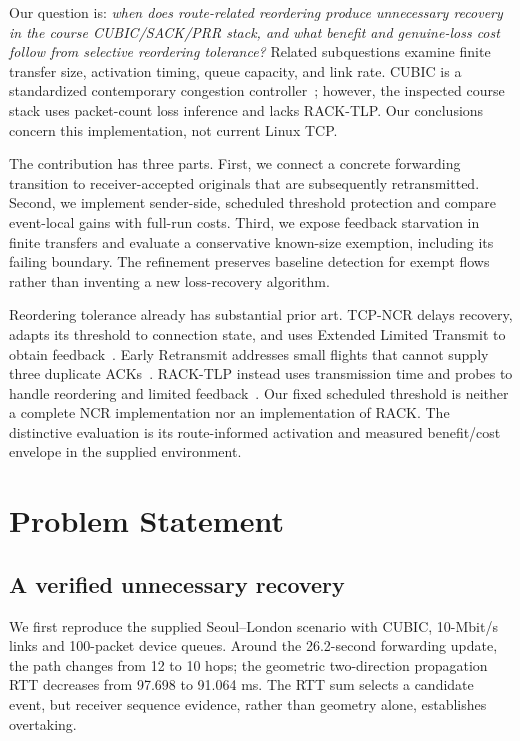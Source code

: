 \documentclass[conference]{IEEEtran}
\begin{document}
Our question is: \emph{when does route-related reordering produce
unnecessary recovery in the course CUBIC/SACK/PRR stack, and what benefit
and genuine-loss cost follow from selective reordering tolerance?}
Related subquestions examine finite transfer size, activation timing,
queue capacity, and link rate. CUBIC is a standardized contemporary
congestion controller~\cite{cubic}; however, the inspected course stack
uses packet-count loss inference and lacks RACK-TLP. Our conclusions
concern this implementation, not current Linux TCP.

The contribution has three parts. First, we connect a concrete forwarding
transition to receiver-accepted originals that are subsequently
retransmitted. Second, we implement sender-side, scheduled threshold
protection and compare event-local gains with full-run costs. Third,
we expose feedback starvation in finite transfers and evaluate a
conservative known-size exemption, including its failing boundary.
The refinement preserves baseline detection for exempt flows rather
than inventing a new loss-recovery algorithm.

Reordering tolerance already has substantial prior art. TCP-NCR delays
recovery, adapts its threshold to connection state, and uses Extended
Limited Transmit to obtain feedback~\cite{ncr}. Early Retransmit addresses
small flights that cannot supply three duplicate ACKs~\cite{early}.
RACK-TLP instead uses transmission time and probes to handle reordering
and limited feedback~\cite{rack}. Our fixed scheduled threshold is
neither a complete NCR implementation nor an implementation of RACK.
The distinctive evaluation is its route-informed activation and
measured benefit/cost envelope in the supplied environment.

\section{Problem Statement}
\subsection{A verified unnecessary recovery}
We first reproduce the supplied Seoul--London scenario with CUBIC,
10-Mbit/s links and 100-packet device queues. Around the 26.2-second
forwarding update, the path changes from 12 to 10 hops; the geometric
two-direction propagation RTT decreases from 97.698 to 91.064 ms.
The RTT sum selects a candidate event, but receiver sequence evidence,
rather than geometry alone, establishes overtaking.
\end{document}
